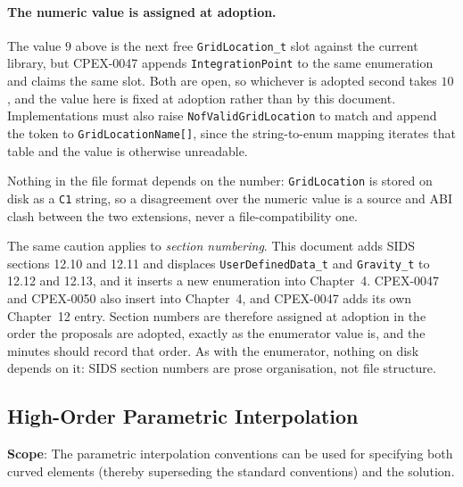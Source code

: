 \documentclass[11pt,letterpaper]{article}
\newenvironment{v2quote}
  {\begin{v2quoteframe}%
   \noindent{\footnotesize\sffamily\bfseries\color{cgnsblue}v2 text}%
   \nopagebreak\par\nopagebreak\vspace{0.15em}}
  {\end{v2quoteframe}}
\newif\ifvfourdraft
\newenvironment{v4block}{\ifvfourdraft\color{v4violet}\fi\ignorespaces}{\par}
\newcommand{\vfourmark}{\ifvfourdraft\textcolor{v4violet}{\textbf{[v4]}}\ \fi}
\begin{document}
\begin{v4block}
\paragraph{\vfourmark The numeric value is assigned at adoption.}
The value $9$ above is the next free \texttt{GridLocation\_t} slot against the
current library, but CPEX-0047 appends \texttt{IntegrationPoint} to the same
enumeration and claims the same slot.  Both are open, so whichever is adopted
second takes $10$, and the value here is fixed at adoption rather than by this
document.  Implementations must also raise \texttt{NofValidGridLocation} to match
and append the token to \texttt{GridLocationName[]}, since the string-to-enum
mapping iterates that table and the value is otherwise unreadable.

Nothing in the file format depends on the number: \texttt{GridLocation} is stored
on disk as a \texttt{C1} string, so a disagreement over the numeric value is a
source and ABI clash between the two extensions, never a file-compatibility one.

The same caution applies to \emph{section numbering}.  This document adds SIDS
sections 12.10 and 12.11 and displaces \texttt{UserDefinedData\_t} and
\texttt{Gravity\_t} to 12.12 and 12.13, and it inserts a new enumeration into
Chapter~4.  CPEX-0047 and CPEX-0050 also insert into Chapter~4, and CPEX-0047 adds
its own Chapter~12 entry.  Section numbers are therefore assigned at adoption in
the order the proposals are adopted, exactly as the enumerator value is, and the
minutes should record that order.  As with the enumerator, nothing on disk depends
on it: SIDS section numbers are prose organisation, not file structure.
\end{v4block}


\subsection{High-Order Parametric Interpolation}
\label{sec:parametric}

\begin{v2quote}
\textbf{Scope}: The parametric interpolation conventions can be used for specifying both curved
elements (thereby superseding the standard conventions) and the solution.
\end{v2quote}
\end{document}
